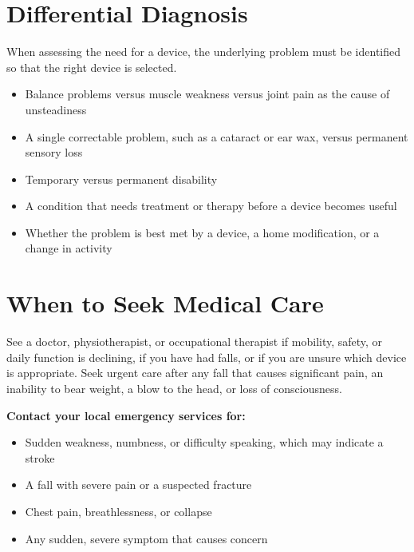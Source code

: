 \section*{Differential Diagnosis}
When assessing the need for a device, the underlying problem must be identified so that the right device is selected.
\begin{itemize}
    \item Balance problems versus muscle weakness versus joint pain as the cause of unsteadiness
    \item A single correctable problem, such as a cataract or ear wax, versus permanent sensory loss
    \item Temporary versus permanent disability
    \item A condition that needs treatment or therapy before a device becomes useful
    \item Whether the problem is best met by a device, a home modification, or a change in activity
\end{itemize}

\section*{When to Seek Medical Care}
See a doctor, physiotherapist, or occupational therapist if mobility, safety, or daily function is declining, if you have had falls, or if you are unsure which device is appropriate. Seek urgent care after any fall that causes significant pain, an inability to bear weight, a blow to the head, or loss of consciousness.

\textbf{Contact your local emergency services for:}
\begin{itemize}
    \item Sudden weakness, numbness, or difficulty speaking, which may indicate a stroke
    \item A fall with severe pain or a suspected fracture
    \item Chest pain, breathlessness, or collapse
    \item Any sudden, severe symptom that causes concern
\end{itemize}

